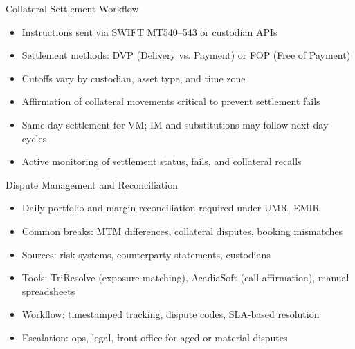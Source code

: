 \documentclass[handout, aspectratio=169]{beamer}
\begin{document}
\begin{frame}{Collateral Settlement Workflow}
  \begin{itemize}
    \item Instructions sent via SWIFT MT540–543 or custodian APIs
    \item Settlement methods: DVP (Delivery vs. Payment) or FOP (Free of Payment)
    \item Cutoffs vary by custodian, asset type, and time zone
    \item Affirmation of collateral movements critical to prevent settlement fails
    \item Same-day settlement for VM; IM and substitutions may follow next-day cycles
    \item Active monitoring of settlement status, fails, and collateral recalls
  \end{itemize}
\end{frame}

\begin{frame}{Dispute Management and Reconciliation}
  \begin{itemize}
    \item Daily portfolio and margin reconciliation required under UMR, EMIR
    \item Common breaks: MTM differences, collateral disputes, booking mismatches
    \item Sources: risk systems, counterparty statements, custodians
    \item Tools: TriResolve (exposure matching), AcadiaSoft (call affirmation), manual spreadsheets
    \item Workflow: timestamped tracking, dispute codes, SLA-based resolution
    \item Escalation: ops, legal, front office for aged or material disputes
  \end{itemize}
\end{frame}
\end{document}
